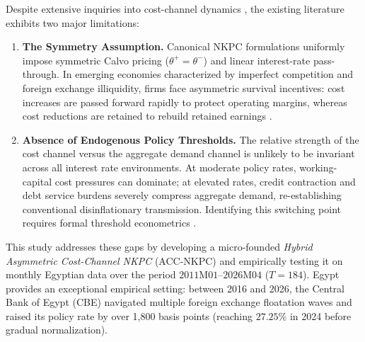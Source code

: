\documentclass[review,12pt]{elsarticle}
\begin{document}
Despite extensive inquiries into cost-channel dynamics \citep{tillmann2008, hulsewig2009},
the existing literature exhibits two major limitations:

\begin{enumerate}[label=\textbf{(\arabic*)}]
\item \textbf{The Symmetry Assumption.} Canonical NKPC formulations uniformly impose
symmetric Calvo pricing ($\theta^{+} = \theta^{-}$) and linear interest-rate pass-through.
In emerging economies characterized by imperfect competition and foreign exchange illiquidity,
firms face asymmetric survival incentives: cost increases are passed forward rapidly to protect
operating margins, whereas cost reductions are retained to rebuild retained earnings
\citep{peltzman2000, shin2014, brun2017, delatte2012}.

\item \textbf{Absence of Endogenous Policy Thresholds.} The relative strength of the
cost channel versus the aggregate demand channel is unlikely to be invariant across all
interest rate environments. At moderate policy rates, working-capital cost pressures can
dominate; at elevated rates, credit contraction and debt service burdens severely compress
aggregate demand, re-establishing conventional disinflationary transmission. Identifying
this switching point requires formal threshold econometrics \citep{hansen2000}.
\end{enumerate}

This study addresses these gaps by developing a micro-founded \textit{Hybrid Asymmetric
Cost-Channel NKPC} (ACC-NKPC) and empirically testing it on monthly Egyptian data over
the period $2011\text{M}01$--$2026\text{M}04$ ($T=184$). Egypt provides an exceptional empirical
setting: between 2016 and 2026, the Central Bank of Egypt (CBE) navigated multiple foreign
exchange floatation waves and raised its policy rate by over 1,800 basis points (reaching
$27.25\%$ in 2024 before gradual normalization).
\end{document}
